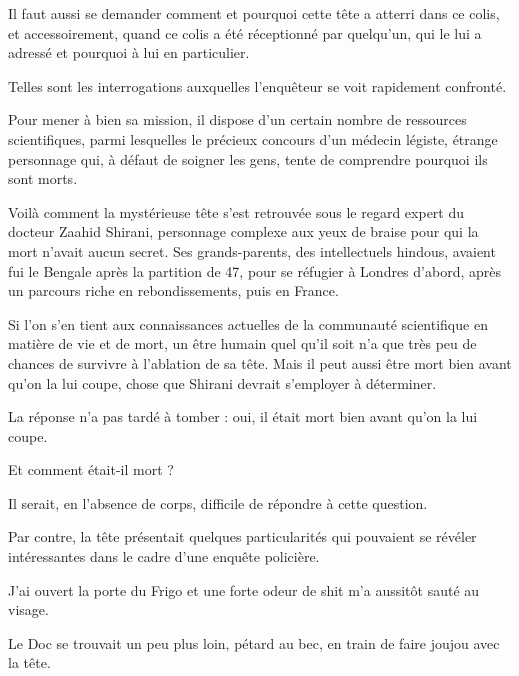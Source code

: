 Il faut aussi se demander comment et pourquoi cette tête a atterri dans ce colis, et accessoirement, quand ce colis a été réceptionné par quelqu’un, qui le lui a adressé et pourquoi à lui en particulier.

Telles sont les interrogations auxquelles l’enquêteur se voit rapidement confronté.

Pour mener à bien sa mission, il dispose d’un certain nombre de ressources scientifiques, parmi lesquelles le précieux concours d’un médecin légiste, étrange personnage qui, à défaut de soigner les gens, tente de comprendre pourquoi ils sont morts.

Voilà comment la mystérieuse tête s’est retrouvée sous le regard expert du docteur Zaahid Shirani, personnage complexe aux yeux de braise pour qui la mort n’avait aucun secret. Ses grands-parents, des intellectuels hindous, avaient fui le Bengale après la partition de 47, pour se réfugier à Londres d’abord, après un parcours riche en rebondissements, puis en France.

%
%
%
Si l’on s’en tient aux connaissances actuelles de la communauté scientifique en matière de vie et de mort, un être humain quel qu’il soit n’a que très peu de chances de survivre à l’ablation de sa tête. Mais il peut aussi être mort bien avant qu’on la lui coupe, chose que Shirani devrait s’employer à déterminer.

La réponse n’a pas tardé à tomber : oui, il était mort bien avant qu’on la lui coupe.

Et comment était-il mort ?

Il serait, en l’absence de corps, difficile de répondre à cette question.

Par contre, la tête présentait quelques particularités qui pouvaient se révéler intéressantes dans le cadre d’une enquête policière.

J’ai ouvert la porte du Frigo et une forte odeur de shit m’a aussitôt sauté au visage.

Le Doc se trouvait un peu plus loin, pétard au bec, en train de faire joujou avec la tête.

